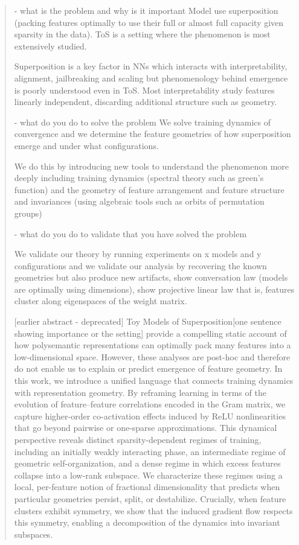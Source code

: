 \documentclass{article}
\theoremstyle{plain}
\numberwithin{equation}{section}
\theoremstyle{definition}
\theoremstyle{remark}
\begin{document}
\begin{abstract}
- what is the problem and why is it important
Model use superposition (packing features optimally to use their full or almost full capacity given sparsity in the data). ToS is a setting where the phenomenon is most extensively studied.

Superposition is a key factor in NNs which interacts with interpretability, alignment, jailbreaking and scaling but phenomenology behind emergence is poorly understood even in ToS. Most interpretability study features linearly independent, discarding additional structure such as geometry.

- what do you do to solve the problem
We solve training dynamics of convergence and we determine the feature geometries of how superposition emerge and under what configurations.


We do this by introducing new tools to understand the phenomenon more deeply including training dynamics (spectral theory such as green's function) and the geometry of feature arrangement and feature structure and invariances (using algebraic tools such as orbits of permutation groups) 

- what do you do to validate that you have solved the problem


We validate our theory by running experiments on x models and y configurations and we validate our analysis by recovering the known geometries but also produce new artifacts, show conversation law (models are optimally using dimensions), show projective linear law that is, features cluster along eigenspaces of the weight matrix.

[earlier abstract - deprecated]
Toy Models of Superposition[one sentence showing importance or the setting] provide a compelling static account of how polysemantic representations can optimally pack many features into a low-dimensional space. However, these analyses are post-hoc and therefore do not enable us to explain or predict emergence of feature geometry. In this work, we introduce a unified language that connects training dynamics with representation geometry. By reframing learning in terms of the evolution of feature–feature correlations encoded in the Gram matrix, we capture higher-order co-activation effects induced by ReLU nonlinearities that go beyond pairwise or one-sparse approximations. This dynamical perspective reveals distinct sparsity-dependent regimes of training, including an initially weakly interacting phase, an intermediate regime of geometric self-organization, and a dense regime in which excess features collapse into a low-rank subspace. We characterize these regimes using a local, per-feature notion of fractional dimensionality that predicts when particular geometries persist, split, or destabilize. Crucially, when feature clusters exhibit symmetry, we show that the induced gradient flow respects this symmetry, enabling a decomposition of the dynamics into invariant subspaces.

\fi
\end{abstract}
\end{document}
